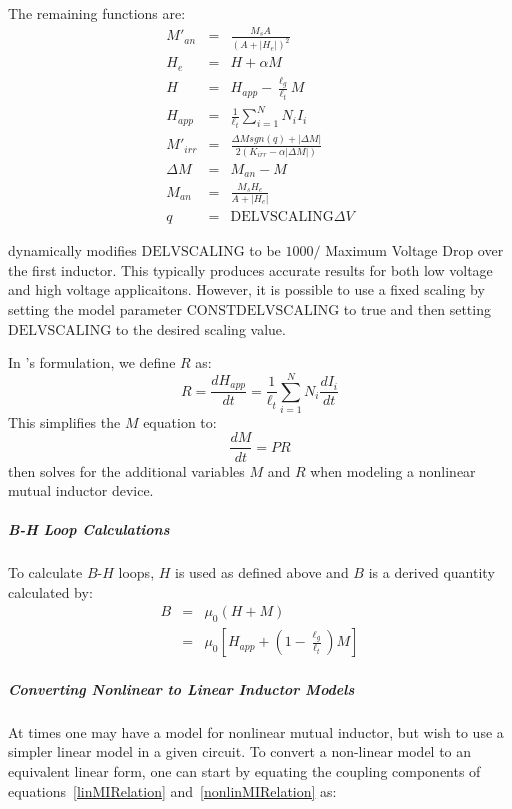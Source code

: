 The remaining functions are:
\begin{eqnarray}
M'_{an} & = & \frac{M_s A}{\left(A + |H_e|\right)^2} \\
H_e & = & H + \alpha M \\
H & = & H_{app} - \frac{\ell_g}{\ell_t}M  \\
H_{app} & = & \frac{1}{\ell_t}\sum_{i=1}^{N} N_i I_i \\
M'_{irr} & = & \frac{\Delta M sgn(q) + |\Delta M|}{2\left(K_{irr} - \alpha |\Delta  M|\right)} \\
\Delta M & = & M_{an} - M \\
M_{an} & = & \frac{M_s H_e}{A + |H_e|} \\
q & = & \mbox{DELVSCALING}  \Delta V
\end{eqnarray}

\Xyce\/ dynamically modifies $\mbox{DELVSCALING}$ to be $1000 / $ Maximum Voltage Drop over the 
first inductor.  This typically produces accurate results for both low voltage and high 
voltage applicaitons.  However, it is possible to use a fixed scaling by setting the 
model parameter $\mbox{CONSTDELVSCALING}$ to true and then setting $\mbox{DELVSCALING}$ 
to the desired scaling value.

In \Xyce{}'s formulation, we define $R$ as:
\begin{equation}
R = \frac{dH_{app}}{dt} = \frac{1}{\ell_t}\sum_{i=1}^{N} N_i \frac{dI_i}{dt}
\end{equation}
This simplifies the $M$ equation to:
\begin{equation}
\frac{dM}{dt} =  P R
\end{equation}
\Xyce{} then solves for the additional variables $M$ and $R$ when modeling a nonlinear
mutual inductor device.

\subparagraph{B-H Loop Calculations}
To calculate $B$-$H$ loops, $H$ is used as defined above and $B$ is a derived quantity
calculated by:
\begin{eqnarray}
B & = & \mu_0 \left( H + M \right) \\
  & = & \mu_0 \left[ H_{app} + \left(1 - \frac{\ell_g}{\ell_t}\right) M \right]
\end{eqnarray}

\subparagraph{Converting Nonlinear to Linear Inductor Models} 
At times one may have a model for nonlinear mutual inductor, but wish to use a 
simpler linear model in a given circuit.  To convert a non-linear model to an 
equivalent linear form, one can start by equating the coupling components of 
equations~\ref{linMIRelation} and~\ref{nonlinMIRelation} as:

